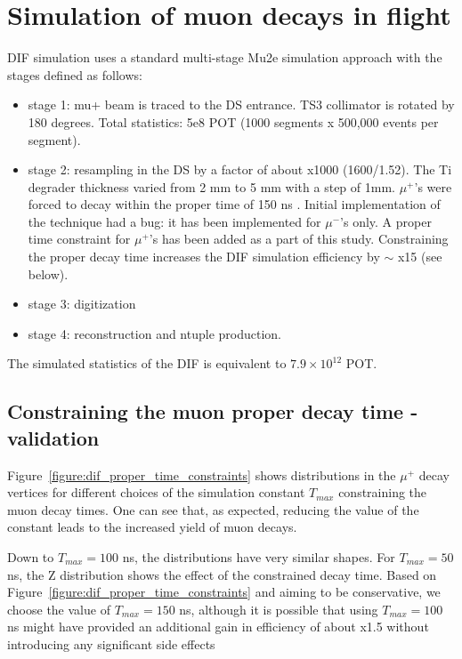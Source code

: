 \section {Simulation of muon decays in flight }

DIF simulation uses a standard multi-stage Mu2e simulation approach with
the stages defined as follows:

\begin{itemize}
\item
  stage 1: mu+ beam is traced to the DS entrance.
  TS3 collimator is rotated by 180 degrees.
  Total statistics: 5e8 POT (1000 segments x 500,000 events per segment).
\item
  stage 2: resampling in the DS by a factor of about x1000 (1600/1.52).
  The Ti degrader thickness varied from 2 mm to 5 mm with a step of 1mm.
  $\mu^+$'s were forced to decay within the proper time of 150 ns \cite{MU2E_41916_KRZYSZTOF}.
  Initial implementation of the technique had a bug: it has been implemented
  for $\mu^-$'s only.
  A proper time constraint for $\mu^+$'s has been added as a part of this study.
  Constraining the proper decay time increases the DIF simulation efficiency
  by $\sim$ x15 (see below).  
\item
  stage 3: digitization
\item
  stage 4: reconstruction and ntuple production.
\end{itemize}

The simulated statistics of the DIF is equivalent to $7.9 \times 10^{12}$ POT.
\subsection {Constraining the muon proper decay time - validation}

Figure~\ref{figure:dif_proper_time_constraints} shows distributions in the $\mu^+$
decay vertices for different choices of the simulation constant $T_{max}$ constraining
the muon decay times.
One can see that, as expected, reducing the value of the constant leads to the increased
yield of muon decays. 

Down to $T_{max}=100$ ns, the distributions have very similar shapes.
For $T_{max}=50$ ns, the Z distribution shows the effect of the constrained
decay time. Based on Figure~\ref{figure:dif_proper_time_constraints} and aiming
to be conservative, we choose the value of $T_{max}=150$ ns, although it is possible
that using $T_{max}=100$ ns might have provided an additional gain in efficiency of about x1.5
without introducing any significant side effects

